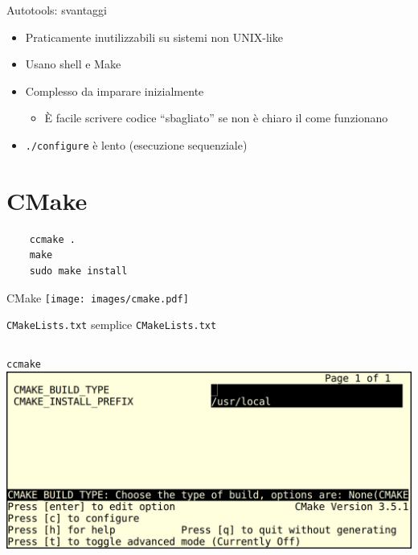 \documentclass[xetex,table]{beamer}
\begin{document}
\begin{frame}{Autotools: svantaggi}
  \begin{itemize}
  \item Praticamente inutilizzabili su sistemi non UNIX-like
  \item Usano shell e Make
  \item Complesso da imparare inizialmente
    \begin{itemize}
    \item È facile scrivere codice ``sbagliato'' se non è chiaro il
      come funzionano
    \end{itemize}
  \item \texttt{./configure} è lento (esecuzione sequenziale)
  \end{itemize}
\end{frame}

\section{CMake}

\begin{frame}[fragile]
  \begin{center}
  \begin{verbatim}
    ccmake .
    make
    sudo make install
  \end{verbatim}
  \end{center}
\end{frame}

\begin{frame}{CMake}
  \center\texttt{[image: images/cmake.pdf]}
\end{frame}

\begin{frame}{\texttt{CMakeLists.txt} semplice}
  \texttt{CMakeLists.txt}
  \inputminted[bgcolor=codebackground,frame=single]{cmake}{examples/4-cmake-1/CMakeLists.txt}
\end{frame}

\begin{frame}{\texttt{ccmake}}
  \center\includegraphics[height=0.4\textheight]{images/ccmake.png}
\end{frame}
\end{document}

